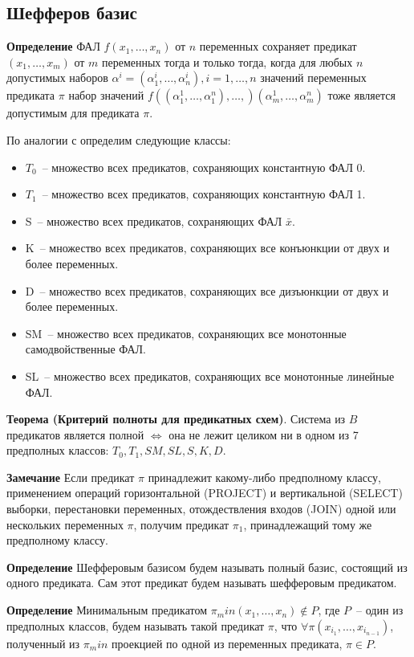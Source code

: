\documentclass[12pt]{article}
\begin{document}
\subsection{Шефферов базис}

\textbf{Определение} ФАЛ
$f (x_1, \ldots, x_n)$ от $n$ переменных сохраняет предикат $ (x_1, \ldots, x_m)$ от $m$
переменных тогда и только тогда, когда для любых $n$ допустимых наборов $\alpha^i = (\alpha_1^i, \ldots, \alpha_n^i), 
i = 1, \ldots, n$ значений переменных предиката $\pi$ набор
значений $f((\alpha_1^1, \ldots, \alpha_1^n), \ldots, )(\alpha_m^1, \ldots, \alpha_m^n)$
тоже является допустимым для предиката $\pi$.

По аналогии с \cite{Shu11} определим следующие классы:
\begin{itemize}
    \item{$T_0$}~-- множество всех предикатов, сохраняющих константную ФАЛ 0.
    \item{$T_1$}~-- множество всех предикатов, сохраняющих константную ФАЛ 1.
    \item{S}~-- множество всех предикатов, сохраняющих ФАЛ $\bar{x}$.
    \item{K}~-- множество всех предикатов, сохраняющих все конъюнкции от двух и более переменных.
    \item{D}~-- множество всех предикатов, сохраняющих все дизъюнкции от двух и более переменных.
    \item{SM}~-- множество всех предикатов, сохраняющих все монотонные самодвойственные ФАЛ.
    \item{SL}~-- множество всех предикатов, сохраняющих все монотонные линейные ФАЛ.
\end{itemize}

\textbf{Теорема (Критерий полноты для предикатных схем)}. Система из $B$ предикатов является полной $\iff$
она не лежит целиком ни в одном из 7 предполных классов: $T_0, T_1, SM, SL, S, K, D$. \cite{Shu11} 

\textbf{Замечание} Если предикат $\pi$ принадлежит какому-либо предполному классу, применением 
операций горизонтальной (PROJECT)
и вертикальной (SELECT) выборки, перестановки переменных, отождествления входов (JOIN)
одной или нескольких переменных $\pi$, получим
предикат $\pi_1$, принадлежащий тому же предполному классу.

\textbf{Определение} Шефферовым базисом будем называть полный базис, состоящий из одного предиката. Сам этот предикат
будем называть шефферовым предикатом.

\textbf{Определение} Минимальным предикатом $\pi_min(x_1, \dots, x_n) \notin P$, где $P$~-- один из предполных классов, будем называть такой 
предикат $\pi$, что $\forall \pi(x_{i_1}, \dots, x_{i_{n-1}})$, полученный из $\pi_min$ проекцией по одной из переменных
предиката, $\pi \in P$.
\end{document}
